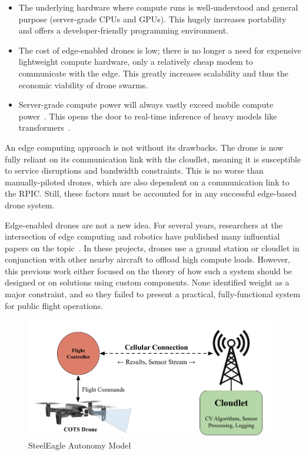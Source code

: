 \begin{itemize}
    \item The underlying hardware where compute runs is well-understood and general purpose (server-grade CPUs and GPUs). This hugely increases portability and offers a developer-friendly programming environment.
    \item The cost of edge-enabled drones is low; there is no longer a need for expensive lightweight compute hardware, only a relatively cheap modem to communicate with the edge. This greatly increases scalability and thus the economic viability of drone swarms.
    \item Server-grade compute power will always vastly exceed mobile compute power~\cite{Qi2012}. This opens the door to real-time inference of heavy models like transformers~\cite{Vaswani2017}.
\end{itemize}

An edge computing approach is not without its drawbacks. The drone is now fully reliant on its communication link with the cloudlet, meaning it is susceptible to service disruptions and bandwidth constraints. This is no worse than manually-piloted drones, which are also dependent on a communication link to the RPIC. Still, these factors must be accounted for in any successful edge-based drone system.

Edge-enabled drones are not a new idea. For several years, researchers at the intersection of edge computing and robotics have published many influential papers on the topic~\cite{Wang2017,Bertizzolo2020,Asaamoning2021,Gharibi2016}. In
these projects, drones use a ground station or cloudlet in conjunction with other nearby aircraft to offload high compute loads. However, this previous work either focused on the theory of how such a system should be designed or on solutions using custom components. None identified weight as a major constraint, and so they failed to present a practical, fully-functional system for public flight operations.

\begin{figure}
    \centering
    \includegraphics[width=1.0\linewidth]{chapter3/FIGS/simplearch.png}
    \caption{SteelEagle Autonomy Model}
    \label{fig:steeleagle-model}
\end{figure}

